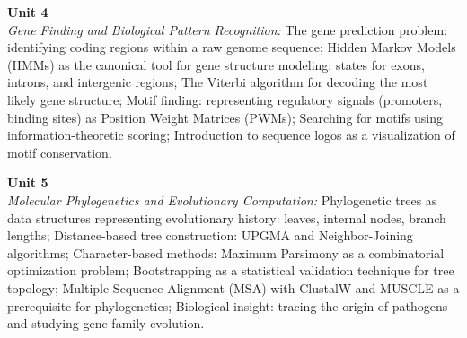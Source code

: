 \vspace{0.3cm}

\noindent\textbf{Unit 4} \\
\textit{Gene Finding and Biological Pattern Recognition:} The gene prediction problem: identifying coding regions within a raw genome sequence; Hidden Markov Models (HMMs) as the canonical tool for gene structure modeling: states for exons, introns, and intergenic regions; The Viterbi algorithm for decoding the most likely gene structure; Motif finding: representing regulatory signals (promoters, binding sites) as Position Weight Matrices (PWMs); Searching for motifs using information-theoretic scoring; Introduction to sequence logos as a visualization of motif conservation.

\vspace{0.3cm}

\noindent\textbf{Unit 5} \\
\textit{Molecular Phylogenetics and Evolutionary Computation:} Phylogenetic trees as data structures representing evolutionary history: leaves, internal nodes, branch lengths; Distance-based tree construction: UPGMA and Neighbor-Joining algorithms; Character-based methods: Maximum Parsimony as a combinatorial optimization problem; Bootstrapping as a statistical validation technique for tree topology; Multiple Sequence Alignment (MSA) with ClustalW and MUSCLE as a prerequisite for phylogenetics; Biological insight: tracing the origin of pathogens and studying gene family evolution.

\newpage
{}
